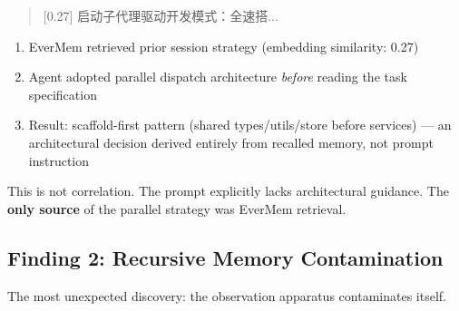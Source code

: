 \documentclass[11pt, a4paper]{article}
\begin{document}
\begin{quote}
\ttfamily\small\color{deep}
[0.27] 启动子代理驱动开发模式：全速搭...
\end{quote}

\begin{keyfinding}
\begin{enumerate}
  \item EverMem retrieved prior session strategy (embedding similarity: 0.27)
  \item Agent adopted parallel dispatch architecture \emph{before} reading the task specification
  \item Result: scaffold-first pattern (shared types/utils/store before services) --- an architectural decision derived entirely from recalled memory, not prompt instruction
\end{enumerate}
This is not correlation. The prompt explicitly lacks architectural guidance. The \textbf{only source} of the parallel strategy was EverMem retrieval.
\end{keyfinding}

\subsection{Finding 2: Recursive Memory Contamination}

The most unexpected discovery: the observation apparatus contaminates itself.
\end{document}
